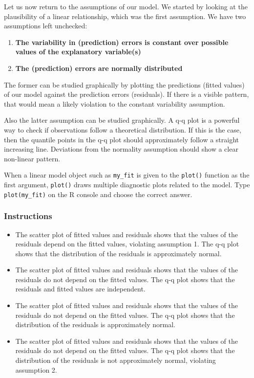 \documentclass[]{article}
\providecommand{\tightlist}{%
  \setlength{\itemsep}{0pt}\setlength{\parskip}{0pt}}
\begin{document}
Let us now return to the assumptions of our model. We started by looking
at the plausibility of a linear relationship, which was the first
assumption. We have two assumptions left unchecked:

\begin{enumerate}
\def\labelenumi{\arabic{enumi}.}
\tightlist
\item
  \textbf{The variability in (prediction) errors is constant over
  possible values of the explanatory variable(s)}
\item
  \textbf{The (prediction) errors are normally distributed}
\end{enumerate}

The former can be studied graphically by plotting the predictions
(fitted values) of our model against the prediction errors (residuals).
If there is a visible pattern, that would mean a likely violation to the
constant variability assumption.

Also the latter assumption can be studied graphically. A q-q plot is a
powerful way to check if observations follow a theoretical distribution.
If this is the case, then the quantile points in the q-q plot should
approximately follow a straight increasing line. Deviations from the
normality assumption should show a clear non-linear pattern.

When a linear model object such as \texttt{my\_fit} is given to the
\texttt{plot()} function as the first argument, \texttt{plot()} draws
multiple diagnostic plots related to the model. Type
\texttt{plot(my\_fit)} on the R console and choose the correct answer.

\hypertarget{instructions-5}{%
\subsubsection{Instructions}\label{instructions-5}}

\begin{itemize}
\tightlist
\item
  The scatter plot of fitted values and residuals shows that the values
  of the residuals depend on the fitted values, violating assumption 1.
  The q-q plot shows that the distribution of the residuals is
  approximately normal.
\item
  The scatter plot of fitted values and residuals shows that the values
  of the residuals do not depend on the fitted values. The q-q plot
  shows that the residuals and fitted values are independent.
\item
  The scatter plot of fitted values and residuals shows that the values
  of the residuals do not depend on the fitted values. The q-q plot
  shows that the distribution of the residuals is approximately normal.
\item
  The scatter plot of fitted values and residuals shows that the values
  of the residuals do not depend on the fitted values. The q-q plot
  shows that the distribution of the residuals is not approximately
  normal, violating assumption 2.
\end{itemize}
\end{document}
